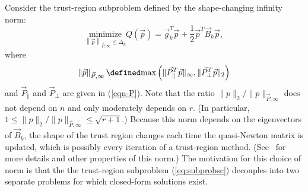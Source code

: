 {\medskip


Consider the trust-region subproblem defined by the shape-changing infinity norm:
\begin{equation}
	\label{eq:subprobsc}
	\underset{\left\| \vec{p} \right\|_{\vec{P},\infty} \le {\Delta_k}}{\text{ minimize }} Q(\vec{p}) = \vec{g}^T_k \vec{p} + \frac{1}{2} \vec{p}^T \vec{B}_k \vec{p},
\end{equation}
where 
\begin{equation}\label{eq:shape-changing_norm}
	\left\| \vec{p} \right\|_{\vec{P},\infty} \defined \text{max}\left( \| \vec{P}^T_{\parallel} \vec{p} \|_{\infty}, \| \vec{P}^T_{\perp} \vec{p} \|_{2} \right)
\end{equation}
and $ \vec{P}_{\parallel} $ and $ \vec{P}_{\perp} $ are given in
(\ref{eqn-P}).  Note that the ratio $\|p\|_2/\|p\|_{\vec{P},\infty}$
  does not depend on $n$ and only moderately depends on $r$. (In particular, $1 \le \|p\|_2/\|p\|_{\vec{P},\infty} \le \sqrt{r+1}$.)
  Because this norm depends on the
eigenvectors of $ \vec{B}_k $, the shape of the trust region changes each
time the quasi-Newton matrix is updated, which is possibly every iteration
of a trust-region method.  (See~\cite{BurdakovLMTR16} for more details and
other properties of this norm.)  The motivation for this choice of norm is
that the the trust-region subproblem (\ref{eq:subprobsc}) decouples into
two separate problems for which closed-form solutions exist.

}
